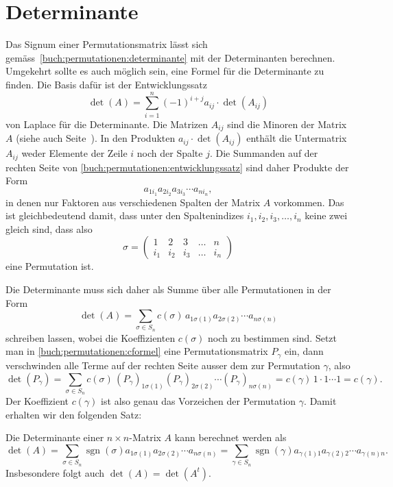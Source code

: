 %
%
%
\section{Determinante
\label{buch:section:determinante}}
Das Signum einer Permutationsmatrix lässt sich
gemäss~\eqref{buch:permutationen:determinante}
mit der Determinanten berechnen.
Umgekehrt sollte es auch möglich sein, eine Formel
für die Determinante zu finden.
Die Basis dafür ist der
Entwicklungssatz 
\begin{equation}
\det(A)
=
\sum_{i=1}^n (-1)^{i+j} a_{i\!j} \cdot \det(A_{i\!j})
\label{buch:permutationen:entwicklungssatz}
\end{equation}
von Laplace für die Determinante.
%
%
Die Matrizen $A_{i\!j}$ sind die Minoren der Matrix $A$
(siehe auch Seite~\pageref{buch:linear:def:minor}).
In den Produkten $a_{i\!j}\cdot\det(A_{i\!j})$ enthält 
die Untermatrix $A_{i\!j}$ weder Elemente der Zeile $i$ noch der 
Spalte $j$.
Die Summanden auf der rechten Seite von
\eqref{buch:permutationen:entwicklungssatz}
sind daher Produkte der Form
\[
a_{1i_1}
a_{2i_2}
a_{3i_3}
\cdots
a_{ni_n},
\]
in denen nur Faktoren aus verschiedenen Spalten der Matrix $A$
vorkommen.
Das ist gleichbedeutend damit, dass unter den Spaltenindizes
$i_1,i_2,i_3,\dots,i_n$ keine zwei gleich sind, dass also
\[
\sigma
=
\begin{pmatrix}
1&2&3&\dots&n\\
i_1&i_2&i_3&\dots&i_n
\end{pmatrix}
\]
eine Permutation ist.

Die Determinante muss sich daher als Summe über alle Permutationen
in der Form
\begin{equation}
\det(A)
=
\sum_{\sigma\in S_n} 
c(\sigma)
\,
a_{1\sigma(1)}
a_{2\sigma(2)}
\cdots
a_{n\sigma(n)}
\label{buch:permutationen:cformel}
\end{equation}
schreiben lassen, wobei die Koeffizienten $c(\sigma)$ noch zu bestimmen
sind.
Setzt man in
\eqref{buch:permutationen:cformel}
eine Permutationsmatrix $P_\gamma$ ein, dann verschwinden alle
Terme auf der rechten Seite ausser dem zur Permutation $\gamma$,
also
\[
\det(P_\gamma)
=
\sum_{\sigma \in S_n}
c(\sigma)
\,
(P_\gamma)_{1\sigma(1)}
(P_\gamma)_{2\sigma(2)}
\cdots
(P_\gamma)_{n\sigma(n)}
=
c(\gamma)
\,
1\cdot 1\cdots 1
=
c(\gamma).
\]
Der Koeffizient $c(\gamma)$ ist also genau das Vorzeichen
der Permutation $\gamma$.
Damit erhalten wir den folgenden Satz:

\begin{satz}
Die Determinante einer $n\times n$-Matrix $A$ kann berechnet werden als
\[
\det(A)
=
\sum_{\sigma\in S_n}
\operatorname{sgn}(\sigma)
a_{1\sigma(1)}
a_{2\sigma(2)}
\cdots
a_{n\sigma(n)}
=
\sum_{\gamma\in S_n}
\operatorname{sgn}(\gamma)
a_{\gamma(1)1}
a_{\gamma(2)2}
\cdots
a_{\gamma(n)n}.
\]
Insbesondere folgt auch $\det(A)=\det(A^t)$.
\end{satz}

